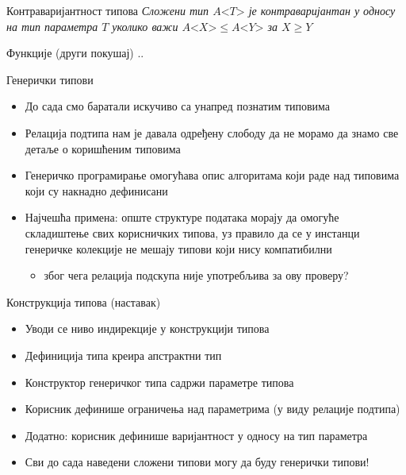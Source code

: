 \documentclass[xcolor=table]{beamer}
\begin{document}
    \begin{frame}{Контраваријантност типова}
    \textit{Сложени тип \begin{math}{A\mathord{<}T\mathord{>}}\end{math} је контраваријантан у односу на тип параметра \begin{math}T\end{math} уколико важи \begin{math}{A\mathord{<}X\mathord{>} \leq A\mathord{<}Y\mathord{>}}\end{math} за \begin{math}X \geq Y\end{math}}
    \end{frame}

    \begin{frame}{Функције (други покушај)}
        ..
    \end{frame}

    \begin{frame}{Генерички типови}
        \begin{itemize}
            \item До сада смо баратали искучиво са унапред познатим типовима
            \item Релација подтипа нам је давала одређену слободу да не морамо да знамо све детаље о коришћеним типовима
            \item Генеричко програмирање омогућава опис алгоритама који раде над типовима који су накнадно дефинисани
            \item Најчешћа примена: опште структуре података морају да омогуће складиштење свих корисничких типова, уз правило да се у инстанци генеричке колекције не мешају типови који нису компатибилни
            \begin{itemize}
                \item због чега релација подскупа није употребљива за ову проверу?
            \end{itemize}
        \end{itemize}
    \end{frame}

    \begin{frame}{Конструкција типова (наставак)}
        \begin{itemize}
            \item Уводи се ниво индирекције у конструкцији типова
            \item Дефиниција типа креира апстрактни тип
            \item Конструктор генеричког типа садржи параметре типова
            \item Корисник дефинише ограничења над параметрима (у виду релације подтипа)
            \item Додатно: корисник дефинише варијантност у односу на тип параметра
            \item Сви до сада наведени сложени типови могу да буду генерички типови!
        \end{itemize}
    \end{frame}
\end{document}
